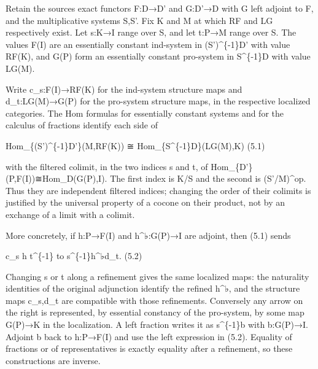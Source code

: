 \documentclass[11pt]{article}
\begin{document}
Retain the source\textquotesingle s exact functors F:\allowbreak{}D\allowbreak{}→D' and G:\allowbreak{}D'\allowbreak{}→D with G left adjoint to F,\allowbreak{} and the multiplicative systems S,\allowbreak{}S'. Fix K and M at which RF and LG respectively exist. Let s:\allowbreak{}K\allowbreak{}→I range over S,\allowbreak{} and let t:\allowbreak{}P\allowbreak{}→M range over S\textquotesingle. The values F(I)\allowbreak{} are an essentially constant ind-system in (S')\allowbreak{}\textasciicircum{}\{-1\}D' with value RF(K)\allowbreak{},\allowbreak{} and G(P)\allowbreak{} form an essentially constant pro-system in S\^{}\{-1\}D with value LG(M)\allowbreak{}.

Write c\_\allowbreak{}s:\allowbreak{}F(I)\allowbreak{}\allowbreak{}→RF(K)\allowbreak{} for the ind-system structure maps and d\_\allowbreak{}t:\allowbreak{}LG(M)\allowbreak{}\allowbreak{}→G(P)\allowbreak{} for the pro-system structure maps,\allowbreak{} in the respective localized categories. The Hom formulas for essentially constant systems and for the calculus of fractions identify each side of

Hom\_\allowbreak{}\{(S')\allowbreak{}\textasciicircum{}\{-1\}D'\}(M,\allowbreak{}RF(K)\allowbreak{})\allowbreak{} ≅ Hom\_\allowbreak{}\{S\textasciicircum{}\{-1\}D\}(LG(M)\allowbreak{},\allowbreak{}K)\allowbreak{} (5.1)\allowbreak{}

with the filtered colimit,\allowbreak{} in the two indices s and t,\allowbreak{} of Hom\_\allowbreak{}\{D'\}(P,\allowbreak{}F(I)\allowbreak{})\allowbreak{}≅Hom\_\allowbreak{}D(G(P)\allowbreak{},\allowbreak{}I)\allowbreak{}. The first index is K/\allowbreak{}S and the second is (S'/\allowbreak{}M)\allowbreak{}\textasciicircum{}op. Thus they are independent filtered indices; changing the order of their colimits is justified by the universal property of a cocone on their product,\allowbreak{} not by an exchange of a limit with a colimit.

More concretely,\allowbreak{} if h:\allowbreak{}P\allowbreak{}→F(I)\allowbreak{} and h\textasciicircum{}{\Rsixtyonesymbolfont ♭}:\allowbreak{}G(P)\allowbreak{}\allowbreak{}→I are adjoint,\allowbreak{} then (5.1)\allowbreak{} sends

c\_\allowbreak{}s h t\^{}\{-1\} to s\textasciicircum{}\{-1\}h\textasciicircum{}{\Rsixtyonesymbolfont ♭}d\_\allowbreak{}t. (5.2)\allowbreak{}

Changing s or t along a refinement gives the same localized maps:\allowbreak{} the naturality identities of the original adjunction identify the refined h\textasciicircum{}{\Rsixtyonesymbolfont ♭},\allowbreak{} and the structure maps c\_\allowbreak{}s,\allowbreak{}d\_\allowbreak{}t are compatible with those refinements. Conversely any arrow on the right is represented,\allowbreak{} by essential constancy of the pro-system,\allowbreak{} by some map G(P)\allowbreak{}\allowbreak{}→K in the localization. A left fraction writes it as s\^{}\{-1\}b with b:\allowbreak{}G(P)\allowbreak{}\allowbreak{}→I. Adjoint b back to h:\allowbreak{}P\allowbreak{}→F(I)\allowbreak{} and use the left expression in (5.2)\allowbreak{}. Equality of fractions or of representatives is exactly equality after a refinement,\allowbreak{} so these constructions are inverse.
\end{document}
